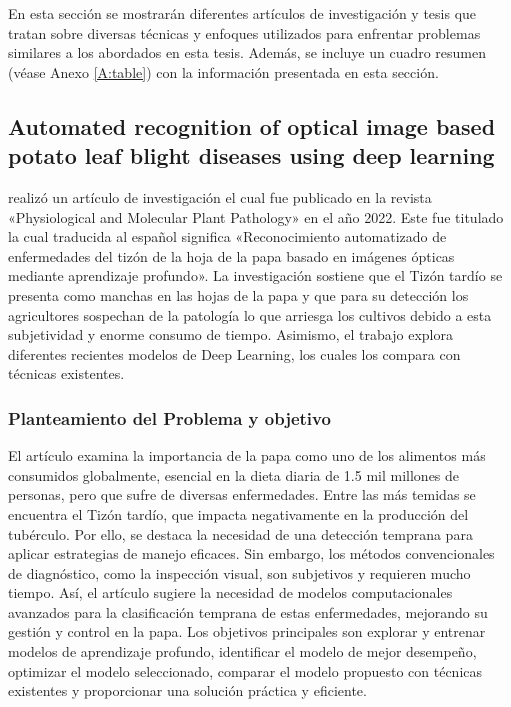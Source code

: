 En esta sección se mostrarán diferentes artículos de investigación y tesis que tratan sobre diversas técnicas y enfoques utilizados para enfrentar problemas similares a los abordados en esta tesis. Además, se incluye un cuadro resumen (véase Anexo \ref{A:table}) con la información presentada en esta sección.


\subsection{Automated recognition of optical image based potato leaf blight diseases using deep learning \citep*{CHAKRABORTY2022101781}}

\citeauthor{CHAKRABORTY2022101781} realizó un artículo de investigación el cual fue publicado en la revista «Physiological and Molecular Plant Pathology» en el año 2022. 
Este fue titulado  la cual traducida al español significa «Reconocimiento automatizado de enfermedades del tizón de la hoja de la papa basado en imágenes ópticas mediante aprendizaje profundo». La investigación sostiene que el Tizón tardío se presenta como manchas en las hojas de la papa y que para su detección los agricultores sospechan de la patología lo que arriesga los cultivos debido a esta subjetividad y enorme consumo de tiempo. Asimismo, el trabajo explora diferentes recientes modelos de Deep Learning, los cuales los compara con técnicas existentes. 

\subsubsection{Planteamiento del Problema y objetivo }
El artículo examina la importancia de la papa como uno de los alimentos más consumidos globalmente, esencial en la dieta diaria de 1.5 mil millones de personas, pero que sufre de diversas enfermedades. Entre las más temidas se encuentra el Tizón tardío, que impacta negativamente en la producción del tubérculo. Por ello, se destaca la necesidad de una detección temprana para aplicar estrategias de manejo eficaces. Sin embargo, los métodos convencionales de diagnóstico, como la inspección visual, son subjetivos y requieren mucho tiempo. Así, el artículo sugiere la necesidad de modelos computacionales avanzados para la clasificación temprana de estas enfermedades, mejorando su gestión y control en la papa. Los objetivos principales son explorar y entrenar modelos de aprendizaje profundo, identificar el modelo de mejor desempeño, optimizar el modelo seleccionado, comparar el modelo propuesto con técnicas existentes y proporcionar una solución práctica y eficiente.

